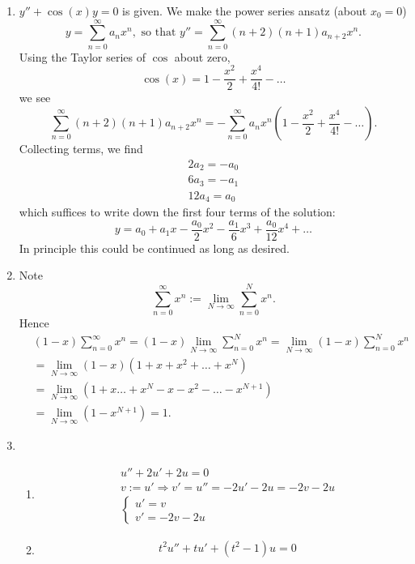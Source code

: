 \documentclass[a4paper,12pt,leqno]{article}
\begin{document}

\begin{enumerate}
\item $ y '' + \cos(x) y = 0$ is given.
We make the power series ansatz (about $x_0 = 0$)
\[ y = \sum_{n=0}^\infty a_n x^n, \text{ so that } y'' = \sum_{n=0}^\infty (n+2)(n+1) a_{n+2} x^n. \]
Using the Taylor series of $\cos$ about zero, 
\[ \cos(x) = 1 - \frac{x^2}{2} + \frac{x^4}{4!} - \ldots \]
we see
\[ \sum_{n=0}^\infty (n+2)(n+1) a_{n+2} x^n = - \sum_{n=0}^\infty a_n x^n \left(1 - \frac{x^2}{2} + \frac{x^4}{4!} - \ldots \right). \]
Collecting terms, we find 
\begin{align*}
2 a_2 = - a_0 \\
6 a_3 = - a_1 \\
12 a_4 = a_0 
\end{align*}
which suffices to write down the first four terms of the solution:
\[ y = a_0 + a_1 x - \frac{a_0}{2}x^2 - \frac{a_1}{6}x^3 + \frac{a_0}{12}x^4 + \ldots \]
In principle this could be continued as long as desired.
\item Note \[ \sum_{n=0}^\infty x^n := \lim_{N \rightarrow \infty} \sum_{n=0}^N x^n. \]
Hence 
\begin{align*}
& (1-x) \sum_{n=0}^\infty x^n = (1-x)\lim_{N \rightarrow \infty} \sum_{n=0}^N x^n = \lim_{N \rightarrow \infty} (1-x) \sum_{n=0}^N x^n \\
&= \lim_{N \rightarrow \infty} (1-x) (1 + x + x^2 + \ldots + x^N) \\
&= \lim_{N \rightarrow \infty} (1 + x \ldots + x^N - x - x^2 - \ldots - x^{N+1})\\
&= \lim_{N \rightarrow \infty} (1-x^{N+1}) = 1.
\end{align*}
\item \begin{enumerate}
\item \begin{align*}
& u'' + 2u' + 2u = 0 \\
& v:= u' \Rightarrow v' = u'' = -2u' - 2u = -2v - 2u\\
& \begin{cases}
u' = v \\
v' = -2v -2u
\end{cases}
\end{align*}
\item 
\begin{align*}
& t^2 u'' + tu' + (t^2 - 1) u = 0 \\

\end{align*}
\end{enumerate}
\end{enumerate}
\end{document}
